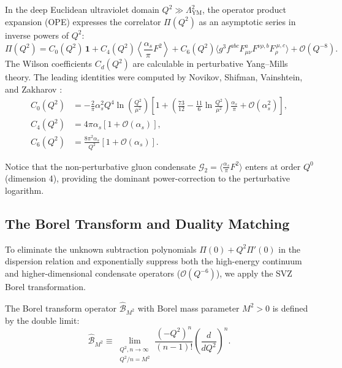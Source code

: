 In the deep Euclidean ultraviolet domain $Q^2 \gg \Lambda_{\mathrm{YM}}^2$, the operator product expansion (OPE) expresses the correlator $\Pi(Q^2)$ as an asymptotic series in inverse powers of $Q^2$:
\begin{equation}
\label{eq:ope_expansion_polarization}
\Pi(Q^2) = C_0(Q^2) \, \mathbf{1} + C_4(Q^2) \left\langle \frac{\alpha_s}{\pi} F^2 \right\rangle + C_6(Q^2) \langle g^3 f^{abc} F_{\mu\nu}^a F^{\nu\rho,b} F_\rho^{\ \mu,c} \rangle + \mathcal{O}(Q^{-8}).
\end{equation}
The Wilson coefficients $C_d(Q^2)$ are calculable in perturbative Yang--Mills theory. The leading identities were computed by Novikov, Shifman, Vainshtein, and Zakharov \cite{Novikov1981}:
\begin{align}
C_0(Q^2) &= -\frac{2}{\pi} \alpha_s^2 Q^4 \ln\left( \frac{Q^2}{\mu^2} \right) \left[ 1 + \left( \frac{73}{12} - \frac{11}{6} \ln\frac{Q^2}{\mu^2} \right) \frac{\alpha_s}{\pi} + \mathcal{O}(\alpha_s^2) \right], \label{eq:c0_coefficient} \\
C_4(Q^2) &= 4 \pi \alpha_s \left[ 1 + \mathcal{O}(\alpha_s) \right], \label{eq:c4_coefficient} \\
C_6(Q^2) &= \frac{8 \pi^2 \alpha_s}{Q^2} \left[ 1 + \mathcal{O}(\alpha_s) \right]. \label{eq:c6_coefficient}
\end{align}

Notice that the non-perturbative gluon condensate $\mathcal{G}_2 = \langle \frac{\alpha_s}{\pi} F^2 \rangle$ enters at order $Q^0$ (dimension 4), providing the dominant power-correction to the perturbative logarithm.

\subsection{The Borel Transform and Duality Matching}
\label{subsec:borel_transform_sum_rule}

To eliminate the unknown subtraction polynomials $\Pi(0) + Q^2 \Pi'(0)$ in the dispersion relation and exponentially suppress both the high-energy continuum and higher-dimensional condensate operators ($\mathcal{O}(Q^{-6})$), we apply the SVZ Borel transformation.

\begin{definition}
\label{def:borel_transformation}
The Borel transform operator $\hat{\mathcal{B}}_{M^2}$ with Borel mass parameter $M^2 > 0$ is defined by the double limit:
\begin{equation}
\label{eq:borel_operator_def}
\hat{\mathcal{B}}_{M^2} \equiv \lim_{\substack{Q^2, n \to \infty \\ Q^2 / n = M^2}} \frac{(-Q^2)^n}{(n - 1)!} \left( \frac{d}{dQ^2} \right)^n.
\end{equation}
\end{definition}

